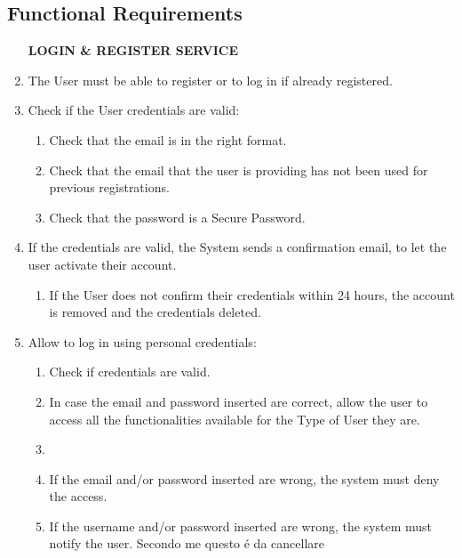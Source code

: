 \documentclass[a4paper, 10pt, oneside]{article}
\newcommand*{\lorenzo}[1]{\textcolor{BurntOrange}{#1}}
\begin{document}
\subsection{Functional Requirements}
\begin{enumerate}[align=left, label={R.\arabic{*}}]
    \item[\textbf{LOGIN \& REGISTER SERVICE}]
    \item \label{req:logOrReg} The User must be able to register or to log in if already registered.
    \item \label{req:credentialsCheck} Check if the User credentials are valid:
    \begin{enumerate}[label={-}]
        \item \label{req:credentialsCheck:email} Check that the email is in the right format.
        \item \label{req:credentialsCheck:uniqueness} Check that the email that the user is providing has not been used for previous registrations.
        \item \label{req:credentialsCheck:password}Check that the password is a Secure Password.
    \end{enumerate}
    \item \label{req:confirmRegistration}If the credentials are valid, the System sends a confirmation email, to let the user activate their account.
    \begin{enumerate}[label={-}]
        \item \label{req:confirmRegistration:timeout}If the User does not confirm their credentials within 24 hours, the account is removed and the credentials deleted.
    \end{enumerate}
    \item \label{req:login} Allow to log in using personal credentials:
    \begin{enumerate}[label={-}]
        \item \label{req:login:checkCred}Check if credentials are valid.
        \item \label{req:login:validCred} In case the email and password inserted are correct, allow the user to access all the functionalities available for the Type of User they are.
        \item \item \label{req:login:invalidCred} If the email and/or password inserted are wrong, the system must deny the access.
        \item If the username and/or password inserted are wrong, the system must notify the user. \lorenzo{Secondo me questo é da cancellare}

\end{enumerate}
\end{enumerate}
\end{document}
